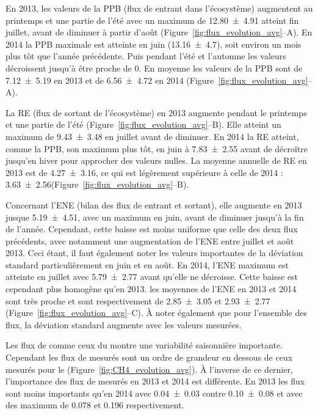 En 2013, les valeurs de la PPB (flux de \coo entrant dans l'écosystème) augmentent au printemps et une partie de l'été avec un maximum de \SI{12.80(491)}{\uml} atteint fin juillet, avant de diminuer à partir d'août (Figure~\ref{fig:flux_evolution_avg}--A).
En 2014 la PPB maximale est atteinte en juin (\SI{13.16(470)}{\uml}), soit environ un mois plus tôt que l'année précédente.
Puis pendant l'été et l'automne les valeurs décroissent jusqu'à être proche de 0.
En moyenne les valeurs de la PPB sont de \SI{7.12(519)}{\uml} en 2013 et de \SI{6.56(472)}{\uml} en 2014 (Figure~\ref{fig:flux_evolution_avg}--A).

La RE (flux de \coo sortant de l'écosystème) en 2013 augmente pendant le printemps et une partie de l'été (Figure~\ref{fig:flux_evolution_avg}--B).
Elle atteint un maximum de \SI{9.43(348)}{\uml} en juillet avant de diminuer.
En 2014 la RE atteint, comme la PPB, son maximum plus tôt, en juin à \SI{7.83(255)}{\uml} avant de décroître jusqu'en hiver pour approcher des valeurs nulles.
La moyenne annuelle de RE en 2013 est de \SI{4.27(316)}{\uml}, ce qui est légèrement supérieure à celle de 2014 : \SI{3.63(256)}{\uml}(Figure~\ref{fig:flux_evolution_avg}--B).

Concernant l'ENE (bilan des flux de \coo entrant et sortant), elle augmente en 2013 jusque \SI{5.19(451)}{\uml}, avec un maximum en juin, avant de diminuer jusqu'à la fin de l'année.
Cependant, cette baisse est moins uniforme que celle des deux flux précédents, avec notamment une augmentation de l'ENE entre juillet et août 2013.
Ceci étant, il faut également noter les valeurs importantes de la déviation standard particulièrement en juin et en août.
En 2014, l'ENE maximum est atteinte en juillet avec \SI{5.79(277)}{\uml} avant qu'elle ne décroisse.
Cette baisse est cependant plus homogène qu'en 2013.
les moyennes de l'ENE en 2013 et 2014 sont très proche et sont respectivement de \SI{2.85(305)}{\uml} et \SI{2.93(277)}{\uml} (Figure~\ref{fig:flux_evolution_avg}--C).
À noter également que pour l'ensemble des flux, la déviation standard augmente avec les valeurs mesurées.


Les flux de \chh comme ceux du \coo montre une variabilité saisonnière importante.
Cependant les flux de \chh mesurés sont un ordre de grandeur en dessous de ceux mesurés pour le \coo (Figure~\ref{fig:CH4_evolution_avg}).
À l'inverse de ce dernier, l'importance des flux de \chh mesurés en 2013 et 2014 est différente.
En 2013 les flux sont moins importants qu'en 2014 avec \num{0.04(003)} contre \SI{0.10(008)}{\uml} et avec des maximum de \num{0.078} et \SI{0.196}{\uml} respectivement.


